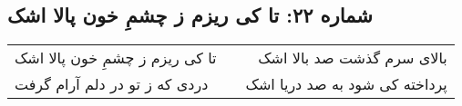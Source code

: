 \begin{center}
\section*{شماره ۲۲: تا کی ریزم ز چشمِ خون پالا اشک}
\label{sec:022}
\begin{longtable}{l p{0.5cm} r}
تا کی ریزم ز چشمِ خون پالا اشک
&&
بالای سرم گذشت صد بالا اشک
\\
دردی که ز تو در دلم آرام گرفت
&&
پرداخته کی شود به صد دریا اشک
\\
\end{longtable}
\end{center}
